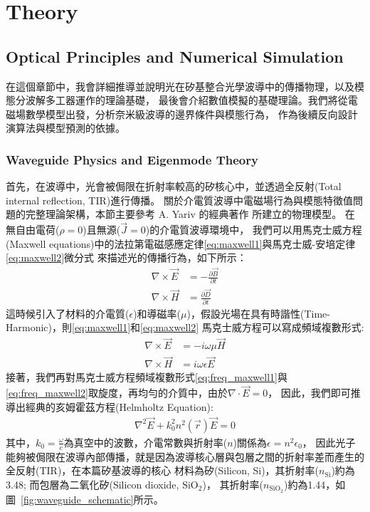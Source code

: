 \chapter{Theory}
\label{ch:architecture}

\section{Optical Principles and Numerical Simulation}
在這個章節中，我會詳細推導並說明光在矽基整合光學波導中的傳播物理，以及模態分波解多工器運作的理論基礎，
最後會介紹數值模擬的基礎理論。我們將從電磁場數學模型出發，分析奈米級波導的邊界條件與模態行為，
作為後續反向設計演算法與模型預測的依據。
\subsection{Waveguide Physics and Eigenmode Theory}
首先，在波導中，光會被侷限在折射率較高的矽核心中，並透過全反射(Total internal reflection, TIR)進行傳播。
關於介電質波導中電磁場行為與模態特徵值問題的完整理論架構，本節主要參考 A. Yariv 的經典著作 \cite{yariv2007_photonics} 所建立的物理模型。
在無自由電荷($\rho = 0$)且無源($\vec{J} = 0$)的介電質波導環境中，
我們可以用馬克士威方程(Maxwell equations)中的法拉第電磁感應定律\eqref{eq:maxwell1}與馬克士威-安培定律\eqref{eq:maxwell2}微分式
來描述光的傳播行為，如下所示：
\begin{align}
\nabla \times \vec{E} &= -\frac{\partial \vec{B}}{\partial t}
\label{eq:maxwell1} \\
\nabla \times \vec{H} &= \frac{\partial \vec{D}}{\partial t}
\label{eq:maxwell2}
\end{align}
這時候引入了材料的介電質($\epsilon$)和導磁率($\mu$)，假設光場在具有時諧性(Time-Harmonic)，則\eqref{eq:maxwell1}和\eqref{eq:maxwell2}
馬克士威方程可以寫成頻域複數形式:
\begin{align}
\nabla \times \vec{E} &= -i\omega\mu\vec{H}
\label{eq:freq_maxwell1} \\
\nabla \times \vec{H} &= i\omega\epsilon\vec{E}
\label{eq:freq_maxwell2}
\end{align}
接著，我們再對馬克士威方程頻域複數形式\eqref{eq:freq_maxwell1}與\eqref{eq:freq_maxwell2}取旋度，再均勻的介質中，由於$\nabla\cdot\vec{E} = 0$，
因此，我們即可推導出經典的亥姆霍茲方程(Helmholtz Equation):
\begin{align}
\nabla^2\vec{E} + k_0^2 n^2(\vec{r})\vec{E} = 0
\label{eq:helmholtz}
\end{align}
其中，$k_0 = \frac{\omega}{c}$為真空中的波數，介電常數與折射率($n$)關係為$\epsilon = n^2\epsilon_0$，
因此光子能夠被侷限在波導內部傳播，就是因為波導核心層與包層之間的折射率差而產生的全反射(TIR)，在本篇矽基波導的核心
材料為矽(Silicon, Si)，其折射率($n_{\mathrm{Si}}$)約為3.48; 而包層為二氧化矽(Silicon dioxide, $\mathrm{SiO_2}$)，
其折射率($n_{\text{SiO}_2}$)約為1.44，如圖~\ref{fig:waveguide_schematic}所示。

